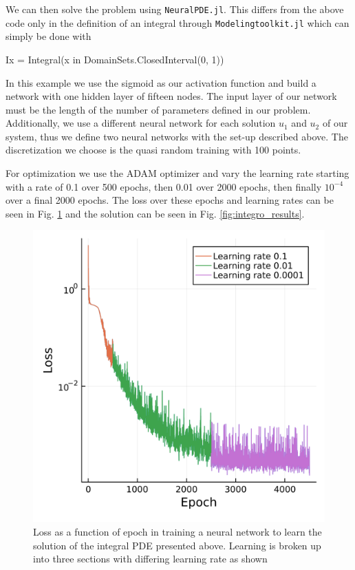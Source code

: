 \documentclass{CUP-JNL-DTM}%
\theoremstyle{definition}
\numberwithin{equation}{section}
\begin{document}
We can then solve the problem using \texttt{NeuralPDE.jl}. This differs from the above code only in the definition of an integral through \texttt{Modelingtoolkit.jl} which can simply be done with

\begin{jllisting}
Ix = Integral(x in DomainSets.ClosedInterval(0, 1))
\end{jllisting}

In this example we use the sigmoid as our activation function and build a network with one hidden layer of fifteen nodes. The input layer of our network must be the length of the number of parameters defined in our problem. Additionally, we use a different neural network for each solution $u_1$ and $u_2$ of our system, thus we define two neural networks with the set-up described above. The discretization we choose is the quasi random training with 100 points. 

For optimization we use the ADAM optimizer and vary the learning rate starting with a rate of 0.1 over 500 epochs, then 0.01 over 2000 epochs, then finally $10^{-4}$ over a final 2000 epochs. The loss over these epochs and learning rates can be seen in Fig. \ref{fig:loss_integro} and the solution can be seen in Fig. \ref{fig:integro_results}.

\begin{figure}
\centering
    \includegraphics[width=0.3\linewidth]{figures/integral_PDE_plots/loss.png}
    \caption{Loss as a function of epoch in training a neural network to learn the solution of the integral PDE presented above. Learning is broken up into three sections with differing learning rate as shown}
    \label{fig:loss_integro}
\end{figure}
\end{document}
